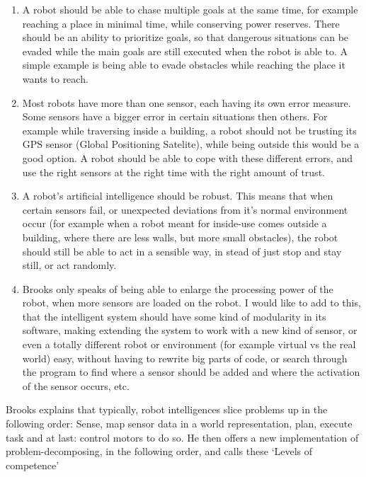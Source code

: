 \documentclass[a4paper,10pt]{article}
\begin{document}
\begin{enumerate}
    \item {} A robot should be able to chase multiple goals at the
    same time, for example reaching a place in minimal time, while conserving
    power reserves. There should be an ability to prioritize goals, so that
    dangerous situations can be evaded while the main goals are still executed
    when the robot is able to. A simple example is being able to evade obstacles
    while reaching the place it wants to reach.
    \item {} Most robots have more than one sensor, each
    having its own error measure. Some sensors have a bigger error in certain
    situations then others. For example while traversing inside a building, a
    robot should not be trusting its GPS sensor (Global Positioning Satelite),
    while being outside this would be a good option. A robot should be able to
    cope with these different errors, and use the right sensors at the right
    time with the right amount of trust.
    \item {} A robot's artificial intelligence should be
    robust. This means that when certain sensors fail, or unexpected
    deviations from it's normal environment occur (for example when a robot
    meant for
    inside-use comes outside a building, where there are less walls, but more
    small obstacles), the robot should still be able to act in a sensible way,
    in stead of just stop and stay still, or act randomly.
    \item {} Brooks only speaks of being able to enlarge
    the processing power of the robot, when more sensors are loaded on the
    robot. I would like to add to this, that the intelligent system should have
    some kind of modularity in its software, making extending the system to work with a new kind
    of sensor, or even a totally different robot or environment (for example
    virtual vs the real world) easy, without having to rewrite big parts of
    code, or search through the program to find where a sensor should be added
    and where the activation of the sensor occurs, etc.
\end{enumerate}

Brooks explains that typically, robot intelligences slice problems up in the
following order: Sense, map sensor data in a world representation, plan, execute
task and at last: control motors to do so. He then offers a new implementation
of problem-decomposing, in the following order, and calls these `Levels of
competence'
\end{document}
